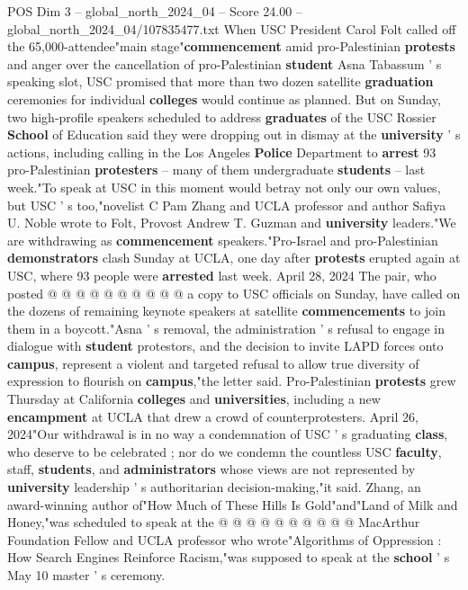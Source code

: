 \begin{textsample}{POS Dim 3 – global\_north\_2024\_04 – Score 24.00 – global\_north\_2024\_04/107835477.txt}  \label{ex:f3_pos_053}
When USC President Carol Folt called off the 65,000-attendee"main stage"\textbf{commencement} amid pro-Palestinian \textbf{protests} and anger over the cancellation of pro-Palestinian \textbf{student} Asna Tabassum ' s speaking slot, USC promised that more than two dozen satellite \textbf{graduation} ceremonies for individual \textbf{colleges} would continue as planned.
But on Sunday, two high-profile speakers scheduled to address \textbf{graduates} of the USC Rossier \textbf{School} of Education said they were dropping out in dismay at the \textbf{university} ' s actions, including calling in the Los Angeles \textbf{Police} Department to \textbf{arrest} 93 pro-Palestinian \textbf{protesters} -- many of them undergraduate \textbf{students} -- last week."To speak at USC in this moment would betray not only our own values, but USC ' s too,"novelist C Pam Zhang and UCLA professor and author Safiya U.
Noble wrote to Folt, Provost Andrew T.
Guzman and \textbf{university} leaders."We are withdrawing as \textbf{commencement} speakers."Pro-Israel and pro-Palestinian \textbf{demonstrators} clash Sunday at UCLA, one day after \textbf{protests} erupted again at USC, where 93 people were \textbf{arrested} last week.
April 28, 2024 The pair, who posted @ @ @ @ @ @ @ @ @ @ a copy to USC officials on Sunday, have called on the dozens of remaining keynote speakers at satellite \textbf{commencements} to join them in a boycott."Asna ' s removal, the administration ' s refusal to engage in dialogue with \textbf{student} protestors, and the decision to invite LAPD forces onto \textbf{campus}, represent a violent and targeted refusal to allow true diversity of expression to flourish on \textbf{campus},"the letter said.
Pro-Palestinian \textbf{protests} grew Thursday at California \textbf{colleges} and \textbf{universities}, including a new \textbf{encampment} at UCLA that drew a crowd of counterprotesters.
April 26, 2024"Our withdrawal is in no way a condemnation of USC ' s graduating \textbf{class}, who deserve to be celebrated ; nor do we condemn the countless USC \textbf{faculty}, staff, \textbf{students}, and \textbf{administrators} whose views are not represented by \textbf{university} leadership ' s authoritarian decision-making,"it said.
Zhang, an award-winning author of"How Much of These Hills Is Gold"and"Land of Milk and Honey,"was scheduled to speak at the @ @ @ @ @ @ @ @ @ @ MacArthur Foundation Fellow and UCLA professor who wrote"Algorithms of Oppression : How Search Engines Reinforce Racism,"was supposed to speak at the \textbf{school} ' s May 10 master ' s ceremony.

\end{textsample}
